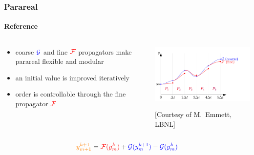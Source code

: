 \documentclass[%
  english,
  hyperref={pdfpagelabels=false},
  aspectratio=1610]{beamer}
\begin{document}
\begin{frame}
  \frametitle{Parareal}
  \framesubtitle{\scriptsize\normalfont Reference}
  \begin{columns}[T]
    \begin{column}{4cm}
      \begin{itemize}
	\item coarse $\mathcal{\textcolor{blue}{G}}$ and fine $\mathcal{\textcolor{red}{F}}$ propagators make parareal
	  flexible and \textcolor{fzjblue30}{modular}
	\item an initial value is improved \textcolor{fzjyellow}{iteratively}
	\item order is controllable through the fine propagator $\mathcal{\textcolor{red}{F}}$ 
      \end{itemize}
    \end{column}
    \begin{column}{8cm}
      \includegraphics[width=8cm]{src/parareal_overview}

      \vspace*{-0.2cm} \hfill {\tiny [Courtesy of M.~Emmett, LBNL]}\\[0.1cm]

  \end{column}
\end{columns}
              \begin{align*}
                  \textcolor{orange}{y_{m+1}^{k+1}} = \textcolor{red}{\mathcal{F}(y_m^k)} + \textcolor{blue}{\mathcal{G}(y_m^{k+1})} - \textcolor{blue}{\mathcal{G}(y_m^k)}
              \end{align*}

\end{frame}
\end{document}

